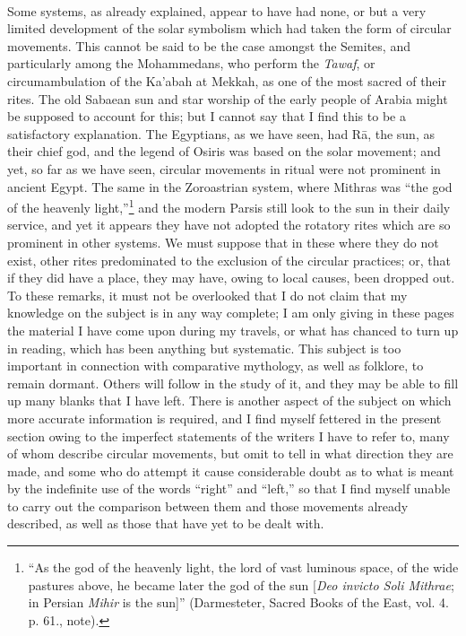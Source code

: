 \documentclass[a4paper, 11pt, oneside, polutonikogreek, english]{article}
\begin{document}
\paragraph{}
Some systems, as already explained, appear to have had none, or but a very limited development of the solar symbolism which had taken the form of circular movements. This cannot be said to be the case amongst the Semites, and particularly among the Mohammedans, who perform the \emph{Tawaf}, or circumambulation of the Ka'abah at Mekkah, as one of the most sacred of their rites. The old Sabaean sun and star worship of the early people of Arabia might be supposed to account for this; but I cannot say that I find this to be a satisfactory explanation. The Egyptians, as we have seen, had Rā, the sun, as their chief god, and the legend of Osiris was based on the solar movement; and yet, so far as we have seen, circular movements in ritual were not prominent in ancient Egypt. The same in the Zoroastrian system, where Mithras was ``the god of the heavenly light,''\footnote{``As the god of the heavenly light, the lord of vast luminous space, of the wide pastures above, he became later the god of the sun [\emph{Deo invicto Soli Mithrae}; in Persian \emph{Mihir} is the sun]'' (Darmesteter, Sacred Books of the East, vol. 4. p. 61., note).} and the modern Parsis still look to the sun in their daily service, and yet it appears they have not adopted the rotatory rites which are so prominent in other systems. We must suppose that in these where they do not exist, other rites predominated to the exclusion of the circular practices; or, that if they did have a place, they may have, owing to local causes, been dropped out. To these remarks, it must not be overlooked that I do not claim that my knowledge on the subject is in any way complete; I am only giving in these pages the material I have come upon during my travels, or what has chanced to turn up in reading, which has been anything but systematic. This subject is too important in connection with comparative mythology, as well as folklore, to remain dormant. Others will follow in the study of it, and they may be able to fill up many blanks that I have left. There is another aspect of the subject on which more accurate information is required, and I find myself fettered in the present section owing to the imperfect statements of the writers I have to refer to, many of whom describe circular movements, but omit to tell in what direction they are made, and some who do attempt it cause considerable doubt as to what is meant by the indefinite use of the words ``right'' and ``left,'' so that I find myself unable to carry out the comparison between them and those movements already described, as well as those that have yet to be dealt with.
\end{document}
